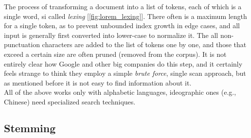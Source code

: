 The process of transforming a document into a list of tokens, each of which is a single word, si called \textit{lexing} [\ref{fig:lorem_lexing}]. There often is a maximum length for a single token, as to prevent unbounded index growth in edge cases, and all input is generally first converted into lower-case to normalize it. The all non-punctuation characters are added to the list of tokens one by one, and those that exceed a certain size are often pruned (removed from the corpus). It is not entirely clear how Google and other big companies do this step, and it certainly feels strange to think they employ a simple \textit{brute force}, single scan approach, but as mentioned before it is not easy to find information about it. \\
All of the above works only with alphabetic languages, ideographic ones (e.g., Chinese) need specialized search techniques. 

\subsection{Stemming}

